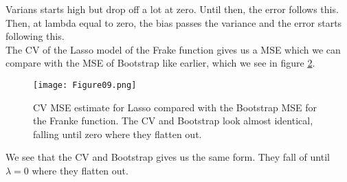 \documentclass[11pt, A4paper, english]{article}
\begin{document}
\begin{multicols}{2}
\begin{figure}[H]
\label{Bootstrap_Lasso}
			\end{figure}
Varians starts high but drop off a lot at zero. Until then, the error follows this. Then, at lambda equal to zero, the bias passes the variance and the error starts following this. \\
The CV of the Lasso model of the Frake function gives us a MSE which we can compare with the MSE of Bootstrap like earlier, which we see in figure \ref{CV_Lasso}.
			\begin{figure}[H]
\texttt{[image: Figure09.png]}
\caption{CV MSE estimate for Lasso compared with the Bootstrap MSE for the Franke function. The CV and Bootstrap look almost identical, falling until zero where they flatten out.}
\label{CV_Lasso}
			\end{figure}
We see that the CV and Bootstrap gives us the same form. They fall of until $\lambda = 0$ where they flatten out. \\

\end{multicols}
\end{document}
